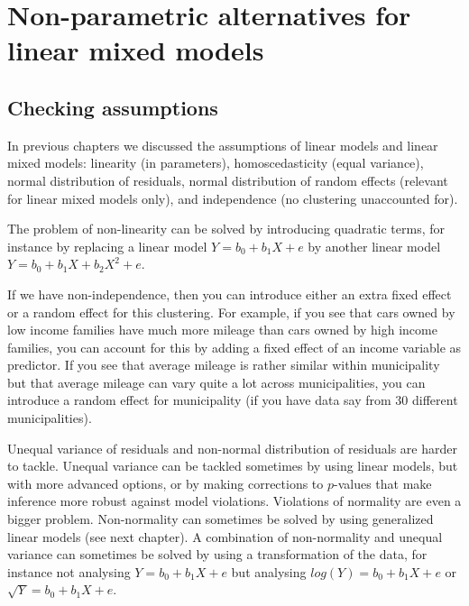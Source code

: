\chapter{Non-parametric alternatives for linear mixed models}\label{chap:nonpar2}


\section{Checking assumptions}

In previous chapters we discussed the assumptions of linear models and linear mixed models: linearity (in parameters), homoscedasticity (equal variance), normal distribution of residuals, normal distribution of random effects (relevant for linear mixed models only), and independence (no clustering unaccounted for). 




The problem of non-linearity can be solved by introducing quadratic terms, for instance by replacing a linear model $Y = b_0 + b_1 X + e$ by another linear model $Y = b_0 + b_1 X + b_2 X^2 + e$.

If we have non-independence, then you can introduce either an extra fixed effect or a random effect for this clustering. For example, if you see that cars owned by low income families have much more mileage than cars owned by high income families, you can account for this by adding a fixed effect of an income variable as predictor. If you see that average mileage is rather similar within municipality but that average mileage can vary quite a lot across municipalities, you can introduce a random effect for municipality (if you have data say from 30 different municipalities). 

Unequal variance of residuals and non-normal distribution of residuals are harder to tackle. Unequal variance can be tackled sometimes by using linear models, but with more advanced options, or by making corrections to $p$-values that make inference more robust against model violations. Violations of normality are even a bigger problem. Non-normality can sometimes be solved by using generalized linear models (see next chapter). A combination of non-normality and unequal variance can sometimes be solved by using a transformation of the data, for instance not analysing $Y = b_0 + b_1 X + e$ but analysing $log(Y)=  b_0 + b_1 X + e$ or $\sqrt{Y}=  b_0 + b_1 X + e$.

